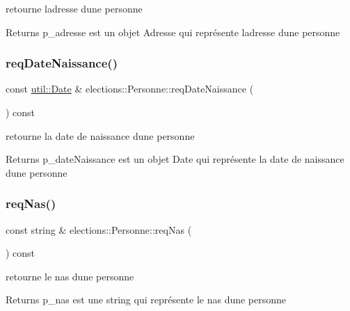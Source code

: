 retourne l\textquotesingle{}adresse d\textquotesingle{}une personne 

\begin{DoxyReturn}{Returns}
p\+\_\+adresse est un objet Adresse qui représente l\textquotesingle{}adresse d\textquotesingle{}une personne 
\end{DoxyReturn}
\mbox{\label{classelections_1_1Personne_a32ff2a825ffb56f8159b6b618a8c897d}} 
\subsubsection{\texorpdfstring{req\+Date\+Naissance()}{reqDateNaissance()}}
{\footnotesize\ttfamily const \hyperlink{classutil_1_1Date}{util\+::\+Date} \& elections\+::\+Personne\+::req\+Date\+Naissance (\begin{DoxyParamCaption}{ }\end{DoxyParamCaption}) const}



retourne la date de naissance d\textquotesingle{}une personne 

\begin{DoxyReturn}{Returns}
p\+\_\+date\+Naissance est un objet Date qui représente la date de naissance d\textquotesingle{}une personne 
\end{DoxyReturn}
\mbox{\label{classelections_1_1Personne_af822cf5097138148a8ecdc4312521743}} 
\subsubsection{\texorpdfstring{req\+Nas()}{reqNas()}}
{\footnotesize\ttfamily const string \& elections\+::\+Personne\+::req\+Nas (\begin{DoxyParamCaption}{ }\end{DoxyParamCaption}) const}



retourne le nas d\textquotesingle{}une personne 

\begin{DoxyReturn}{Returns}
p\+\_\+nas est une string qui représente le nas d\textquotesingle{}une personne 
\end{DoxyReturn}
\mbox{\label{classelections_1_1Personne_a46cfdb57aa5d46c54b3a8c2860ca2e30}} 
